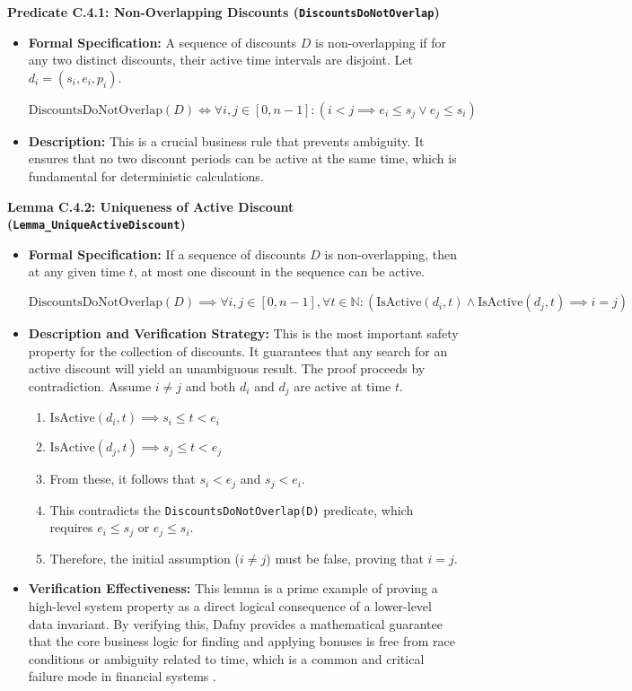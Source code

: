 \documentclass[
  english,
  onecolumn]{article}
\providecommand{\tightlist}{%
  \setlength{\itemsep}{0pt}\setlength{\parskip}{0pt}}
\begin{document}
\textbf{Predicate C.4.1: Non-Overlapping Discounts
(\texttt{DiscountsDoNotOverlap})}

\begin{itemize}
\item
  \textbf{Formal Specification:} A sequence of discounts \(D\) is
  non-overlapping if for any two distinct discounts, their active time
  intervals are disjoint. Let \(d_i = (s_i, e_i, p_i)\).

  \(\text{DiscountsDoNotOverlap}(D) \iff \forall i, j \in [0, n-1] : (i < j \implies e_i \le s_j \lor e_j \le s_i)\)
\item
  \textbf{Description:} This is a crucial business rule that prevents
  ambiguity. It ensures that no two discount periods can be active at
  the same time, which is fundamental for deterministic calculations.
\end{itemize}

\textbf{Lemma C.4.2: Uniqueness of Active Discount
(\texttt{Lemma\_UniqueActiveDiscount})}

\begin{itemize}
\item
  \textbf{Formal Specification:} If a sequence of discounts \(D\) is
  non-overlapping, then at any given time \(t\), at most one discount in
  the sequence can be active.

  \(\text{DiscountsDoNotOverlap}(D) \implies \forall i, j \in [0, n-1], \forall t \in \mathbb{N} : (\text{IsActive}(d_i, t) \land \text{IsActive}(d_j, t) \implies i = j)\)
\item
  \textbf{Description and Verification Strategy:} This is the most
  important safety property for the collection of discounts. It
  guarantees that any search for an active discount will yield an
  unambiguous result. The proof proceeds by contradiction. Assume
  \(i \ne j\) and both \(d_i\) and \(d_j\) are active at time \(t\).

  \begin{enumerate}
  \def\labelenumi{\arabic{enumi}.}
  \tightlist
  \item
    \(\text{IsActive}(d_i, t) \implies s_i \le t < e_i\)
  \item
    \(\text{IsActive}(d_j, t) \implies s_j \le t < e_j\)
  \item
    From these, it follows that \(s_i < e_j\) and \(s_j < e_i\).
  \item
    This contradicts the \texttt{DiscountsDoNotOverlap(D)} predicate,
    which requires \(e_i \le s_j\) or \(e_j \le s_i\).
  \item
    Therefore, the initial assumption (\(i \ne j\)) must be false,
    proving that \(i = j\).
  \end{enumerate}
\item
  \textbf{Verification Effectiveness:} This lemma is a prime example of
  proving a high-level system property as a direct logical consequence
  of a lower-level data invariant. By verifying this, Dafny provides a
  mathematical guarantee that the core business logic for finding and
  applying bonuses is free from race conditions or ambiguity related to
  time, which is a common and critical failure mode in financial systems
  \citep{luu2016making}.
\end{itemize}
\end{document}

